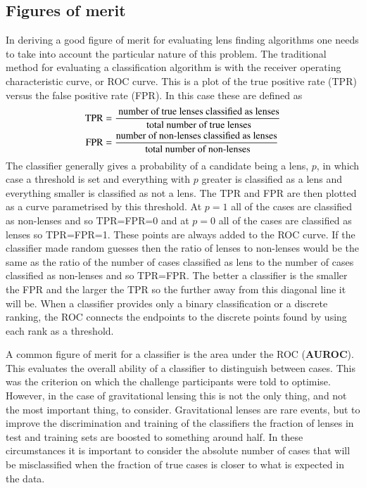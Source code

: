 \documentclass{aa}
\begin{document}
\subsection{Figures of merit}
\label{sec:figure_of_merit}

In deriving a good figure of merit for evaluating lens finding algorithms one needs to take into account the particular nature of this problem.
The traditional method for evaluating a classification algorithm is with the receiver operating characteristic curve, or  ROC  curve.  This is a plot of the true positive rate (TPR) versus the false positive rate (FPR).  In this case these are defined as
\begin{align}
{\rm TPR} &= \frac{\textrm{ number of true lenses classified as lenses}}{\textrm{ total number of true lenses}} \\
{\rm FPR} &= \frac{\textrm{number of non-lenses classified as lenses}}{\textrm{ total number of non-lenses}}
\end{align}
The classifier generally gives a probability of a candidate being a lens, $p$, in which case a threshold is set and everything with $p$ greater is classified as a lens and everything smaller is classified as not a lens.  The TPR and FPR are then plotted as a curve parametrised by this threshold.  At $p=1$ all of the cases are classified as non-lenses and so TPR=FPR=0 and at $p=0$ all of the cases are classified as lenses so TPR=FPR=1.  These points are always added to the ROC curve.  If the classifier made random guesses then the ratio of lenses to non-lenses would be the same as the ratio of the number of cases classified as lens to the number of cases classified as non-lenses and so TPR=FPR.  The better a classifier is the smaller the FPR and the larger the TPR so the further away from this diagonal line it will be.  When a classifier provides only a binary classification or a discrete ranking, the ROC connects the endpoints to the discrete points found by using each rank as a threshold.

A common figure of merit for a classifier is the area under the ROC ({\bf AUROC}).  This evaluates the overall ability of a classifier to distinguish between cases.  This was the criterion on which the challenge participants were told to optimise.  However, in the case of gravitational lensing this is not the only thing, and not the most important thing, to consider.  Gravitational lenses are rare events, but to improve the discrimination and training of the classifiers the fraction of lenses in test and training sets are boosted to something around half.  In these circumstances it is important to consider the absolute number of cases that will be misclassified when the fraction of true cases is closer to what is expected in the data.
\end{document}
